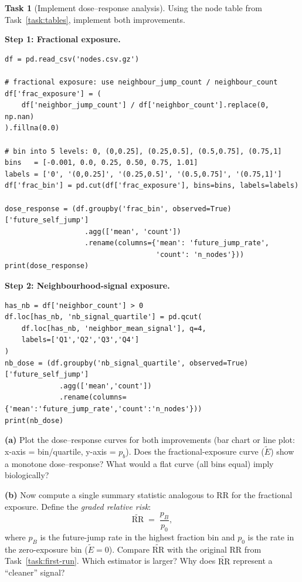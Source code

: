 \documentclass[11pt,a4paper]{article}
\theoremstyle{definition}
\newtheorem{task}{Task}
\newcommand{\RR}{\mathrm{RR}}
\newcommand{\1}[1]{\mathbf{1}\!\left[#1\right]}
\begin{document}
\begin{task}[Implement dose--response analysis]\label{task:dose-response}
Using the node table from Task~\ref{task:tables}, implement both improvements.

\medskip
\noindent\textbf{Step 1: Fractional exposure.}
\begin{framed}
\begin{verbatim}
df = pd.read_csv('nodes.csv.gz')

# fractional exposure: use neighbour_jump_count / neighbour_count
df['frac_exposure'] = (
    df['neighbor_jump_count'] / df['neighbor_count'].replace(0, np.nan)
).fillna(0.0)

# bin into 5 levels: 0, (0,0.25], (0.25,0.5], (0.5,0.75], (0.75,1]
bins   = [-0.001, 0.0, 0.25, 0.50, 0.75, 1.01]
labels = ['0', '(0,0.25]', '(0.25,0.5]', '(0.5,0.75]', '(0.75,1]']
df['frac_bin'] = pd.cut(df['frac_exposure'], bins=bins, labels=labels)

dose_response = (df.groupby('frac_bin', observed=True)['future_self_jump']
                   .agg(['mean', 'count'])
                   .rename(columns={'mean': 'future_jump_rate',
                                    'count': 'n_nodes'}))
print(dose_response)
\end{verbatim}
\end{framed}

\noindent\textbf{Step 2: Neighbourhood-signal exposure.}
\begin{framed}
\begin{verbatim}
has_nb = df['neighbor_count'] > 0
df.loc[has_nb, 'nb_signal_quartile'] = pd.qcut(
    df.loc[has_nb, 'neighbor_mean_signal'], q=4,
    labels=['Q1','Q2','Q3','Q4']
)
nb_dose = (df.groupby('nb_signal_quartile', observed=True)['future_self_jump']
             .agg(['mean','count'])
             .rename(columns={'mean':'future_jump_rate','count':'n_nodes'}))
print(nb_dose)
\end{verbatim}
\end{framed}

\noindent\textbf{(a)} Plot the dose--response curves for both improvements
(bar chart or line plot: x-axis = bin/quartile, y-axis = $p_b$).
Does the fractional-exposure curve ($\tilde{E}$) show a monotone
dose--response?
What would a flat curve (all bins equal) imply biologically?



\noindent\textbf{(b)} Now compute a single summary statistic analogous to $\RR$
for the fractional exposure.
Define the \emph{graded relative risk}:
\[
  \widetilde{\RR}
  \;=\;
  \frac{p_{B}}{p_{0}},
\]
where $p_B$ is the future-jump rate in the highest fraction bin and $p_0$ is
the rate in the zero-exposure bin ($\tilde{E}=0$).
Compare $\widetilde{\RR}$ with the original $\RR$ from Task~\ref{task:first-run}.
Which estimator is larger?
Why does $\widetilde{\RR}$ represent a ``cleaner'' signal?




\end{task}
\end{document}
